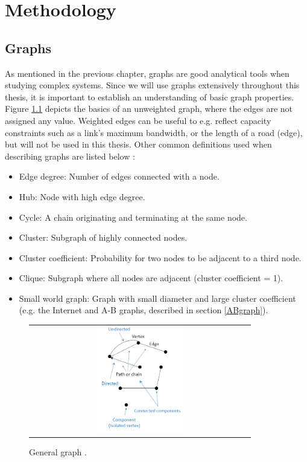 \chapter{Methodology}

\section{Graphs}
As mentioned in the previous chapter, graphs are good analytical tools when studying complex systems. Since we will use graphs extensively throughout this thesis, it is important to establish an understanding of basic graph properties. Figure \ref{fig:generalGraph} depicts the basics of an unweighted graph, where the edges are not assigned any value. Weighted edges can be useful to e.g. reflect capacity constraints such as a link's maximum bandwidth, or the length of a road (edge), but will not be used in this thesis. Other common definitions used when describing graphs are listed below \cite{audestad}:
\begin{itemize}
\item Edge degree: Number of edges connected with a node.
\item Hub: Node with high edge degree.
\item Cycle: A chain originating and terminating at the same node.
\item Cluster: Subgraph of highly connected nodes.
\item Cluster coefficient: Probability for two nodes to be adjacent to a third node.
\item Clique: Subgraph where all nodes are adjacent (cluster coefficient = 1).
\item Small world graph: Graph with small diameter and large cluster coefficient (e.g. the Internet and A-B graphs, described in section \ref{ABgraph}).
\end{itemize}

\begin{figure}[h]
\centering
\begin{tabular}{@{}c@{}}
\includegraphics[width=0.4\textwidth]{../Figures/generalGraph.png}
\end{tabular}
\caption{\label{fig:generalGraph} General graph \cite{audestad}.}
\end{figure}

